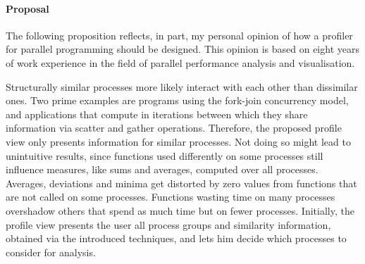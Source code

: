 \documentclass[a4paper, final, diplominf]{zih-template}
\begin{document}
\paragraph{Proposal}
\label{sec:evaluation-visualisations-new-proposal}
The following proposition reflects, in part, my personal opinion of how a profiler for parallel programming should be designed.
This opinion is based on eight years of work experience in the field of parallel performance analysis and visualisation.

Structurally similar processes more likely interact with each other than dissimilar ones.
Two prime examples are programs using the fork-join concurrency model, and applications that compute in iterations between which they share information via scatter and gather operations.
Therefore, the proposed profile view only presents information for similar processes.
Not doing so might lead to unintuitive results, since functions used differently on some processes still influence measures, like sums and averages, computed over all processes.
Averages, deviations and minima get distorted by zero values from functions that are not called on some processes.
Functions wasting time on many processes overshadow others that spend as much time but on fewer processes.
Initially, the profile view presents the user all process groups and similarity information, obtained via the introduced techniques, and lets him decide which processes to consider for analysis.
\end{document}
